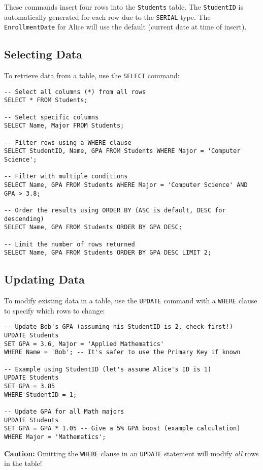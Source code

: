 \documentclass[12pt]{book}
\begin{document}
These commands insert four rows into the \texttt{Students} table. The \texttt{StudentID} is automatically generated for each row due to the \texttt{SERIAL} type. The \texttt{EnrollmentDate} for Alice will use the default (current date at time of insert).

\subsection{Selecting Data}

To retrieve data from a table, use the \texttt{SELECT} command:

\begin{lstlisting}[caption={Selecting data from Students}, label=lst:select_students]
-- Select all columns (*) from all rows
SELECT * FROM Students;

-- Select specific columns
SELECT Name, Major FROM Students;

-- Filter rows using a WHERE clause
SELECT StudentID, Name, GPA FROM Students WHERE Major = 'Computer Science';

-- Filter with multiple conditions
SELECT Name, GPA FROM Students WHERE Major = 'Computer Science' AND GPA > 3.8;

-- Order the results using ORDER BY (ASC is default, DESC for descending)
SELECT Name, GPA FROM Students ORDER BY GPA DESC;

-- Limit the number of rows returned
SELECT Name, GPA FROM Students ORDER BY GPA DESC LIMIT 2;
\end{lstlisting}

\subsection{Updating Data}

To modify existing data in a table, use the \texttt{UPDATE} command with a \texttt{WHERE} clause to specify which rows to change:

\begin{lstlisting}[caption={Updating data in Students}, label=lst:update_students]
-- Update Bob's GPA (assuming his StudentID is 2, check first!)
UPDATE Students
SET GPA = 3.6, Major = 'Applied Mathematics'
WHERE Name = 'Bob'; -- It's safer to use the Primary Key if known

-- Example using StudentID (let's assume Alice's ID is 1)
UPDATE Students
SET GPA = 3.85
WHERE StudentID = 1;

-- Update GPA for all Math majors
UPDATE Students
SET GPA = GPA * 1.05 -- Give a 5% GPA boost (example calculation)
WHERE Major = 'Mathematics';
\end{lstlisting}
\textbf{Caution:} Omitting the \texttt{WHERE} clause in an \texttt{UPDATE} statement will modify \emph{all} rows in the table!
\end{document}
